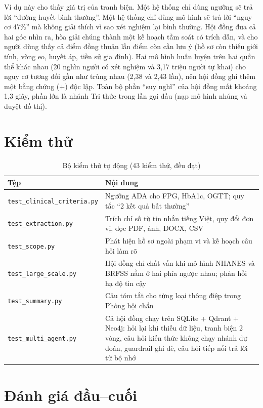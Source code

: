 Ví dụ này cho thấy giá trị của tranh biện. Một hệ thống chỉ dùng ngưỡng sẽ trả lời ``đường huyết bình thường''. Một hệ thống chỉ dùng mô hình sẽ trả lời ``nguy cơ 47\%'' mà không giải thích vì sao xét nghiệm lại bình thường. Hội đồng đưa cả hai góc nhìn ra, hòa giải chúng thành một kế hoạch tầm soát có trích dẫn, và cho người dùng thấy cả điểm đồng thuận lẫn điểm còn cần lưu ý (hồ sơ còn thiếu giới tính, vòng eo, huyết áp, tiền sử gia đình). Hai mô hình huấn luyện trên hai quần thể khác nhau (20 nghìn người có xét nghiệm và 3,17 triệu người tự khai) cho nguy cơ tương đối gần như trùng nhau (2,38 và 2,43 lần), nên hội đồng ghi thêm một bằng chứng (+) độc lập. Toàn bộ phần ``suy nghĩ'' của hội đồng mất khoảng 1,3 giây, phần lớn là nhánh Tri thức trong lần gọi đầu (nạp mô hình nhúng và duyệt đồ thị).

\section{Kiểm thử}

\begin{table}[H]
\centering
\caption{Bộ kiểm thử tự động (43 kiểm thử, đều đạt)}
\label{tab:tests}
\small
\begin{tabularx}{\linewidth}{@{}L{4.4cm}Y@{}}
\toprule
\textbf{Tệp} & \textbf{Nội dung} \\
\midrule
\texttt{test\_clinical\_criteria.py} & Ngưỡng ADA cho FPG, HbA1c, OGTT; quy tắc ``2 kết quả bất thường'' \\
\texttt{test\_extraction.py} & Trích chỉ số từ tin nhắn tiếng Việt, quy đổi đơn vị, đọc PDF, ảnh, DOCX, CSV \\
\texttt{test\_scope.py} & Phát hiện hồ sơ ngoài phạm vi và kế hoạch câu hỏi làm rõ \\
\texttt{test\_large\_scale.py} & Hội đồng chỉ chất vấn khi mô hình NHANES và BRFSS nằm ở hai phía ngược nhau; phản hồi hạ độ tin cậy \\
\texttt{test\_summary.py} & Câu tóm tắt cho từng loại thông điệp trong Phòng hội chẩn \\
\texttt{test\_multi\_agent.py} & Cả hội đồng chạy trên SQLite + Qdrant + Neo4j: hỏi lại khi thiếu dữ liệu, tranh biện 2 vòng, câu hỏi kiến thức không chạy nhánh dự đoán, guardrail ghi đè, câu hỏi tiếp nối trả lời từ bộ nhớ \\
\bottomrule
\end{tabularx}
\end{table}

\section{Đánh giá đầu–cuối}

